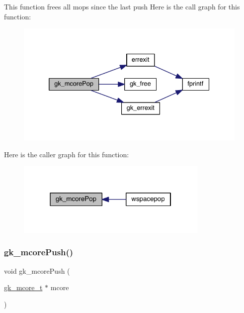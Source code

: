 This function frees all mops since the last push Here is the call graph for this function\+:\nopagebreak
\begin{figure}[H]
\begin{center}
\leavevmode
\includegraphics[width=332pt]{a00077_ac7b3189a2be11b6736dc4c27d3d30f3a_cgraph}
\end{center}
\end{figure}
Here is the caller graph for this function\+:\nopagebreak
\begin{figure}[H]
\begin{center}
\leavevmode
\includegraphics[width=262pt]{a00077_ac7b3189a2be11b6736dc4c27d3d30f3a_icgraph}
\end{center}
\end{figure}
\mbox{\label{a00077_a07579694837248c1f2908860edc643c0}} 
\subsubsection{\texorpdfstring{gk\+\_\+mcore\+Push()}{gk\_mcorePush()}}
{\footnotesize\ttfamily void gk\+\_\+mcore\+Push (\begin{DoxyParamCaption}\item[{\hyperlink{a00682}{gk\+\_\+mcore\+\_\+t} $\ast$}]{mcore }\end{DoxyParamCaption})}

